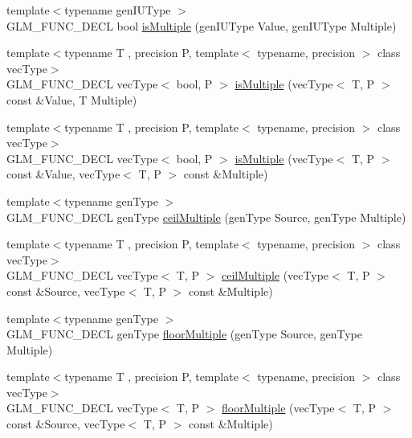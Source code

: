 \begin{DoxyCompactItemize}
\item 
{\footnotesize template$<$typename gen\+I\+U\+Type $>$ }\\G\+L\+M\+\_\+\+F\+U\+N\+C\+\_\+\+D\+E\+C\+L bool \hyperlink{group__gtc__round_gaf7444a7b2eb524f373463ceba76b9326}{is\+Multiple} (gen\+I\+U\+Type Value, gen\+I\+U\+Type Multiple)
\item 
{\footnotesize template$<$typename T , precision P, template$<$ typename, precision $>$ class vec\+Type$>$ }\\G\+L\+M\+\_\+\+F\+U\+N\+C\+\_\+\+D\+E\+C\+L vec\+Type$<$ bool, P $>$ \hyperlink{group__gtc__round_ga50ea5d5dc33fffba39ad6002a3784123}{is\+Multiple} (vec\+Type$<$ T, P $>$ const \&Value, T Multiple)
\item 
{\footnotesize template$<$typename T , precision P, template$<$ typename, precision $>$ class vec\+Type$>$ }\\G\+L\+M\+\_\+\+F\+U\+N\+C\+\_\+\+D\+E\+C\+L vec\+Type$<$ bool, P $>$ \hyperlink{group__gtc__round_ga7ae705574ef3e3ebfb4f537d8d285c48}{is\+Multiple} (vec\+Type$<$ T, P $>$ const \&Value, vec\+Type$<$ T, P $>$ const \&Multiple)
\item 
{\footnotesize template$<$typename gen\+Type $>$ }\\G\+L\+M\+\_\+\+F\+U\+N\+C\+\_\+\+D\+E\+C\+L gen\+Type \hyperlink{group__gtc__round_gac84898c466e609cdd2e81d9ba907d9e8}{ceil\+Multiple} (gen\+Type Source, gen\+Type Multiple)
\item 
{\footnotesize template$<$typename T , precision P, template$<$ typename, precision $>$ class vec\+Type$>$ }\\G\+L\+M\+\_\+\+F\+U\+N\+C\+\_\+\+D\+E\+C\+L vec\+Type$<$ T, P $>$ \hyperlink{group__gtc__round_gafe632af669ac57d670ca18e3665a12ca}{ceil\+Multiple} (vec\+Type$<$ T, P $>$ const \&Source, vec\+Type$<$ T, P $>$ const \&Multiple)
\item 
{\footnotesize template$<$typename gen\+Type $>$ }\\G\+L\+M\+\_\+\+F\+U\+N\+C\+\_\+\+D\+E\+C\+L gen\+Type \hyperlink{group__gtc__round_ga9eafb9dbedf84e5cece65c2fe9d5631d}{floor\+Multiple} (gen\+Type Source, gen\+Type Multiple)
\item 
{\footnotesize template$<$typename T , precision P, template$<$ typename, precision $>$ class vec\+Type$>$ }\\G\+L\+M\+\_\+\+F\+U\+N\+C\+\_\+\+D\+E\+C\+L vec\+Type$<$ T, P $>$ \hyperlink{group__gtc__round_ga6912db42d43873fe1dedb3aed2b7a239}{floor\+Multiple} (vec\+Type$<$ T, P $>$ const \&Source, vec\+Type$<$ T, P $>$ const \&Multiple)

\end{DoxyCompactItemize}
